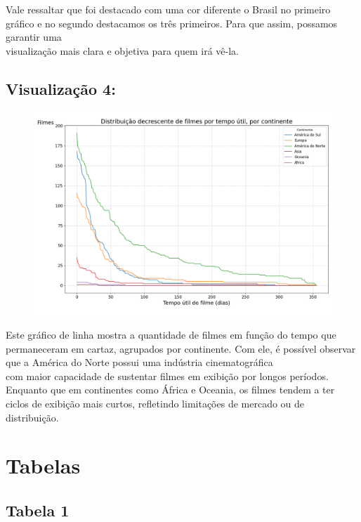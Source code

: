 \documentclass{article}
\begin{document}
Vale ressaltar que foi destacado com uma cor diferente o Brasil no primeiro gráfico e no segundo destacamos os três primeiros. Para que assim, possamos garantir uma\\
visualização mais clara e objetiva para quem irá vê-la.

\subsection*{Visualização 4:}
\begin{figure}[H]
    \centerline{\includegraphics[width = \linewidth]{img/Figure_4.png}}
\end{figure}

Este gráfico de linha mostra a quantidade de filmes em função do tempo que permaneceram em cartaz, agrupados por continente. Com ele, é possível observar que a América do Norte possui uma indústria cinematográfica\\
com maior capacidade de sustentar filmes em exibição por longos períodos. Enquanto que em continentes como África e Oceania, os filmes tendem a ter ciclos de exibição mais curtos, refletindo limitações de mercado ou de distribuição.

\section*{Tabelas}

\subsection*{Tabela 1}
\end{document}
